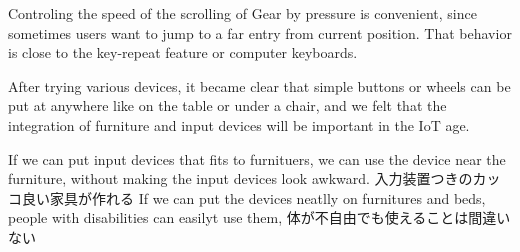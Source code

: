 \documentclass{article}
\begin{document}
Controling the speed of the scrolling of Gear by pressure is convenient,
since sometimes users want to jump to a far entry from current position.
That behavior is close to the key-repeat feature or computer keyboards.



After trying various devices, it became clear that simple buttons or
wheels can be put at anywhere like on the table or under a chair, and
we felt that the integration of furniture and input devices will be
important in the IoT age.

If we can put input devices that fits to furnituers, we can use the device near the furniture, without making the input devices look awkward.
  入力装置つきのカッコ良い家具が作れる
 If we can put the devices neatlly on furnitures and beds, people with disabilities can easilyt use them, 
 体が不自由でも使えることは間違いない

\end{document}

